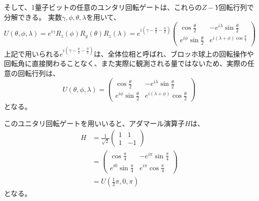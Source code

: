 \documentclass[platex,dvipdfmx]{jlreq}			%
\begin{document}
そして、1量子ビットの任意のユンタリ回転ゲートは、これらの$Z-Y$回転行列で分解できる。
実数$\gamma, \phi, \theta, \lambda$を用いて、
\begin{equation}
    U(\theta, \phi, \lambda)　= e^{i \gamma} R_z(\phi) R_y(\theta) R_z(\lambda) = e^{i(\gamma - \frac{\theta}{2} - \frac{\phi}{2})}
    \begin{pmatrix}
        \cos{\frac{\theta}{2}} & -e^{i\lambda} \sin{\frac{\theta}{2}} \\
        e^{i\phi}\sin{\frac{\theta}{2}} & e^{i(\lambda + \phi) \cos{\frac{\theta}{2}}}
    \end{pmatrix}
\end{equation}
上記で用いられる$e^{i(\gamma - \frac{\theta}{2} - \frac{\phi}{2})}$は、全体位相と呼ばれ、ブロッホ球上の回転操作や回転角に直接関わることなく、また実際に観測される量ではないため、実際の任意の回転行列は、
\begin{equation}
    \label{eq: hoge}
    U(\theta, \phi, \lambda) = 
    \begin{pmatrix}
        \cos{\frac{\theta}{2}} & -e^{i \lambda}\sin{\frac{\theta}{2}} \\
        e^{i \phi} \sin{\frac{\theta}{2}} & e^{i(\lambda + \phi)} \cos{\frac{\theta}{2}}
    \end{pmatrix}
\end{equation}
となる。

このユニタリ回転ゲートを用いいると、アダマール演算子$H$は、
\begin{align}
    H &= \frac{1}{\sqrt{2}} \begin{pmatrix}
        1 & 1 \\
        1 & -1
    \end{pmatrix} \\
    &= \begin{pmatrix}
        \cos{\frac{\pi}{4}} & -e^{i \pi} \sin{\frac{\pi}{4}} \\
        e^{i 0}\sin{\frac{\pi}{4}} & e^{i \pi} \cos{\frac{\pi}{4}}
    \end{pmatrix} \\
    &= U(\frac{1}{2}\pi, 0, \pi)
\end{align}
となる。
\end{document}
